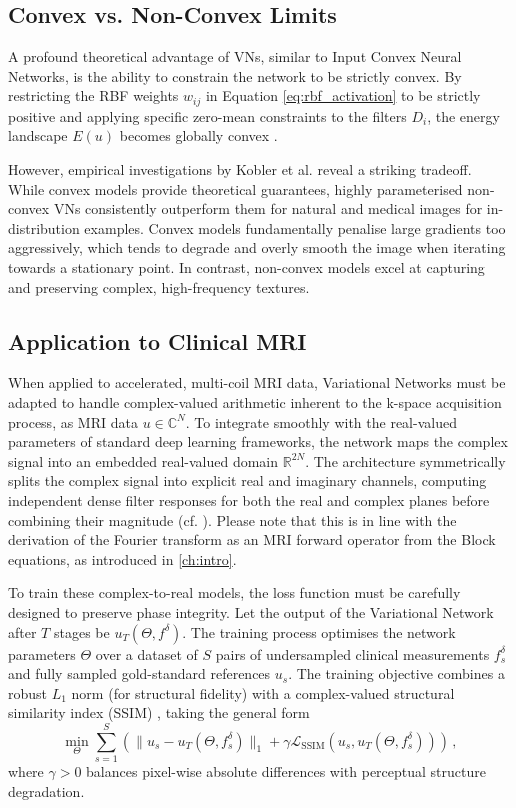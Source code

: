 \subsection{Convex vs. Non-Convex Limits}

A profound theoretical advantage of VNs, similar to Input Convex Neural Networks, is the ability to constrain the network to be strictly convex. By restricting the RBF weights $w_{ij}$ in Equation \eqref{eq:rbf_activation} to be strictly positive and applying specific zero-mean constraints to the filters $D_i$, the energy landscape $E(u)$ becomes globally convex \cite{kobler2017variational}. 

However, empirical investigations by Kobler et al. \cite{kobler2017variational} reveal a striking tradeoff. While convex models provide theoretical guarantees, highly parameterised non-convex VNs consistently outperform them for natural and medical images for in-distribution examples. Convex models fundamentally penalise large gradients too aggressively, which tends to degrade and overly smooth the image when iterating towards a stationary point. In contrast, non-convex models excel at capturing and preserving complex, high-frequency textures.

\subsection{Application to Clinical MRI}

When applied to accelerated, multi-coil MRI data, Variational Networks must be adapted to handle complex-valued arithmetic inherent to the k-space acquisition process, as MRI data $u \in \mathbb{C}^N$. To integrate smoothly with the real-valued parameters of standard deep learning frameworks, the network maps the complex signal into an embedded real-valued domain $\mathbb{R}^{2N}$. The architecture symmetrically splits the complex signal into explicit real and imaginary channels, computing independent dense filter responses for both the real and complex planes before combining their magnitude (cf. \cite{hammernik2018learning}). Please note that this is in line with the derivation of the Fourier transform as an MRI forward operator from the Block equations, as introduced in \ref{ch:intro}.

To train these complex-to-real models, the loss function must be carefully designed to preserve phase integrity. Let the output of the Variational Network after $T$ stages be $u_T(\Theta, f^\delta)$. The training process optimises the network parameters $\Theta$ over a dataset of $S$ pairs of undersampled clinical measurements $f_s^\delta$ and fully sampled gold-standard references $u_s$. The training objective combines a robust $L_1$ norm (for structural fidelity) with a complex-valued structural similarity index (SSIM) \cite{wang2004image}, taking the general form
\begin{equation}
    \min_{\Theta} \sum_{s=1}^S \left( \| u_s - u_T(\Theta, f_s^\delta) \|_1 + \gamma \mathcal{L}_{\text{SSIM}}(u_s, u_T(\Theta, f_s^\delta)) \right) \, ,
    \label{eq:hammernik_loss}
\end{equation}
where $\gamma > 0$ balances pixel-wise absolute differences with perceptual structure degradation.

